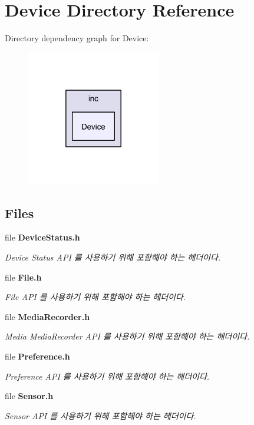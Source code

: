 \section{Device Directory Reference}
\label{dir_a0c8867dd1d16fcf077501a0ef1cd801}
Directory dependency graph for Device\-:
\nopagebreak
\begin{figure}[H]
\begin{center}
\leavevmode
\includegraphics[width=166pt]{dir_a0c8867dd1d16fcf077501a0ef1cd801_dep}
\end{center}
\end{figure}
\subsection*{Files}
\begin{DoxyCompactItemize}
\item 
file {\bf Device\-Status.\-h}
\begin{DoxyCompactList}\small\item\em Device Status A\-P\-I 를 사용하기 위해 포함해야 하는 헤더이다. \end{DoxyCompactList}\item 
file {\bf File.\-h}
\begin{DoxyCompactList}\small\item\em File A\-P\-I 를 사용하기 위해 포함해야 하는 헤더이다. \end{DoxyCompactList}\item 
file {\bf Media\-Recorder.\-h}
\begin{DoxyCompactList}\small\item\em Media Media\-Recorder A\-P\-I 를 사용하기 위해 포함해야 하는 헤더이다. \end{DoxyCompactList}\item 
file {\bf Preference.\-h}
\begin{DoxyCompactList}\small\item\em Preference A\-P\-I 를 사용하기 위해 포함해야 하는 헤더이다. \end{DoxyCompactList}\item 
file {\bf Sensor.\-h}
\begin{DoxyCompactList}\small\item\em Sensor A\-P\-I 를 사용하기 위해 포함해야 하는 헤더이다. \end{DoxyCompactList}\end{DoxyCompactItemize}
